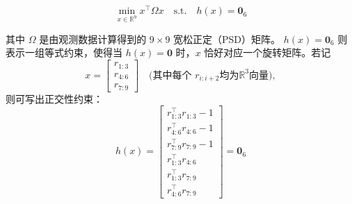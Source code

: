 \begin{equation}
	\min_{x \in \mathbb{R}^9}   x^\top \Omega x
	\quad \text{s.t.} \quad
	h(x) = \mathbf{0}_6
\end{equation}

其中 $\Omega$ 是由观测数据计算得到的 $9 \times 9$ 宽松正定（PSD）矩阵。  
$h(x) = \mathbf{0}_6$ 则表示一组等式约束，使得当 $h(x)=\mathbf{0}$ 时，$x$ 恰好对应一个旋转矩阵。若记
\[
x = 
\begin{bmatrix}
	r_{1:3} \\[2pt]
	r_{4:6} \\[2pt]
	r_{7:9}
\end{bmatrix}
\quad\text{(其中每个 }r_{i:i+2}\text{均为}\mathbb{R}^3\text{向量)},
\]
则可写出正交性约束：
\begin{equation}
	h(x)  = 
	\begin{bmatrix}
		r_{1:3}^\top r_{1:3}  -  1 \\
		r_{4:6}^\top r_{4:6}  -  1 \\
		r_{7:9}^\top r_{7:9}  -  1 \\
		r_{1:3}^\top r_{4:6} \\
		r_{1:3}^\top r_{7:9} \\
		r_{4:6}^\top r_{7:9}
	\end{bmatrix}
	 = 
	\mathbf{0}_6 
\end{equation}
